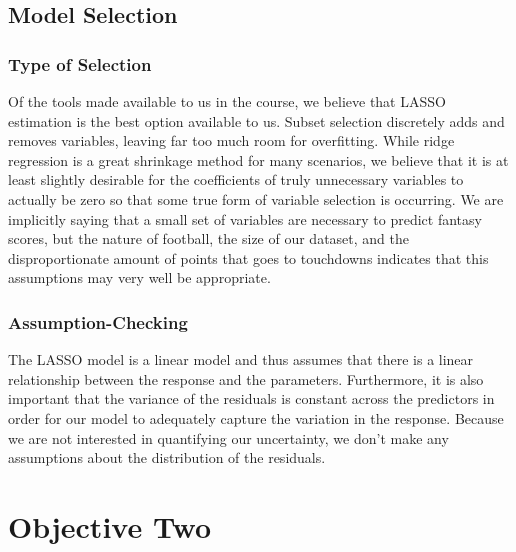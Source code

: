 \documentclass[american,]{article}
\begin{document}
\subsection{Model Selection}\label{model-selection}

\subsubsection{Type of Selection}\label{type-of-selection}

Of the tools made available to us in the course, we believe that LASSO
estimation is the best option available to us. Subset selection
discretely adds and removes variables, leaving far too much room for
overfitting. While ridge regression is a great shrinkage method for many
scenarios, we believe that it is at least slightly desirable for the
coefficients of truly unnecessary variables to actually be zero so that
some true form of variable selection is occurring. We are implicitly
saying that a small set of variables are necessary to predict fantasy
scores, but the nature of football, the size of our dataset, and the
disproportionate amount of points that goes to touchdowns indicates that
this assumptions may very well be appropriate.

\subsubsection{Assumption-Checking}\label{assumption-checking}

The LASSO model is a linear model and thus assumes that there is a
linear relationship between the response and the parameters.
Furthermore, it is also important that the variance of the residuals is
constant across the predictors in order for our model to adequately
capture the variation in the response. Because we are not interested in
quantifying our uncertainty, we don't make any assumptions about the
distribution of the residuals.

\section{Objective Two}\label{objective-two}

\renewcommand\refname{Conclusion}

\end{document}
